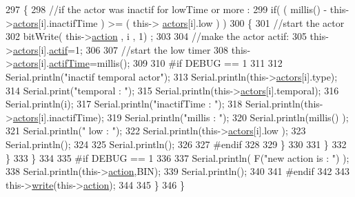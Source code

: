 \begin{DoxyCode}
297                 \{
298                     \textcolor{comment}{//if the actor was inactif for lowTime or more :}
299                     \textcolor{keywordflow}{if}( ( millis() - this->\hyperlink{classJetpack_a7e16d2f97837f9712a2e6de1c50d99db}{actors}[i].inactifTime ) >= ( this->
      \hyperlink{classJetpack_a7e16d2f97837f9712a2e6de1c50d99db}{actors}[i].low  ) )
300                     \{
301                         \textcolor{comment}{//start the actor}
302                         bitWrite( this->\hyperlink{classJetpack_aca3142925a7b0834b34ae91d26af7765}{action} , i , 1) ;
303 
304                         \textcolor{comment}{//make the actor actif:}
305                         this->\hyperlink{classJetpack_a7e16d2f97837f9712a2e6de1c50d99db}{actors}[i].\hyperlink{structJetpack_1_1state_aa177541689bbaea21a4650a083b0df77}{actif}=1;
306 
307                         \textcolor{comment}{//start the low timer}
308                         this->\hyperlink{classJetpack_a7e16d2f97837f9712a2e6de1c50d99db}{actors}[i].\hyperlink{structJetpack_1_1state_af2e1cc323ef9ffcc3cf4d203f85d726b}{actifTime}=millis();
309 
310 \textcolor{preprocessor}{                    #if DEBUG == 1 }
311                         
312                         Serial.println(\textcolor{stringliteral}{"inactif temporal actor"});
313                         Serial.println(this->\hyperlink{classJetpack_a7e16d2f97837f9712a2e6de1c50d99db}{actors}[i].type);
314                         Serial.print(\textcolor{stringliteral}{"temporal : "});
315                         Serial.println(this->\hyperlink{classJetpack_a7e16d2f97837f9712a2e6de1c50d99db}{actors}[i].temporal);
316                         Serial.println(i);
317                         Serial.println(\textcolor{stringliteral}{"inactifTime : "});
318                         Serial.println(this->\hyperlink{classJetpack_a7e16d2f97837f9712a2e6de1c50d99db}{actors}[i].inactifTime);
319                         Serial.println(\textcolor{stringliteral}{"millis : "});
320                         Serial.println(millis() );
321                         Serial.println(\textcolor{stringliteral}{" low : "});
322                         Serial.println(this->\hyperlink{classJetpack_a7e16d2f97837f9712a2e6de1c50d99db}{actors}[i].low );
323                         Serial.println();
324 
325                         Serial.println();
326                     
327 \textcolor{preprocessor}{                    #endif}
328                 
329                     \}           
330             
331                 \}
332             \}
333         \}
334     
335 \textcolor{preprocessor}{    #if DEBUG == 1 }
336 
337         Serial.println( F(\textcolor{stringliteral}{"new action is : "}) );
338         Serial.println(this->\hyperlink{classJetpack_aca3142925a7b0834b34ae91d26af7765}{action},BIN);
339         Serial.println();
340     
341 \textcolor{preprocessor}{    #endif }
342 
343         this->\hyperlink{classJetpack_a338f1af8cbc6504ac69b47c7328569b5}{write}(this->\hyperlink{classJetpack_aca3142925a7b0834b34ae91d26af7765}{action});
344 
345     \} 
346 \}
\end{DoxyCode}
